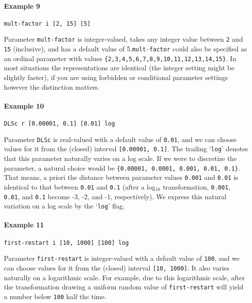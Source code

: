 \documentclass[manual.tex]{subfiles}
\begin{document}
\paragraph{Example 9}
\begin{verbatim}
mult-factor i [2, 15] [5]
\end{verbatim}
Parameter \texttt{mult-factor} is integer-valued, takes any integer value between \texttt{2} and \texttt{15} (inclusive), and has a default value of 5.\texttt{mult-factor} could also be specified as an ordinal parameter with values \texttt{\{2,3,4,5,6,7,8,9,10,11,12,13,14,15\}}. In most situations the representations are identical (the integer setting might be slightly faster), if you are using forbidden or conditional parameter settings however the distinction matters.



\paragraph{Example 10}
\begin{verbatim}
DLSc r [0.00001, 0.1] [0.01] log
\end{verbatim}
Parameter \texttt{DLSc} is real-valued with a default value of \texttt{0.01}, and we can choose values for it from the (closed) interval \texttt{[0.00001, 0.1]}.
The trailing `\texttt{log}' denotes that this parameter naturally varies on a log scale. If we were to discretize the parameter, a natural choice would be
\texttt{\{0.00001, 0.0001, 0.001, 0.01, 0.1\}}. That means, a priori the distance between parameter values \texttt{0.001} and \texttt{0.01} is identical to that between \texttt{0.01} and \texttt{0.1} (after a log$_{10}$ transformation, \texttt{0.001}, \texttt{0.01}, and \texttt{0.1} become -3, -2, and -1, respectively).
We express this natural variation on a log scale by the `\texttt{log}' flag. %

\paragraph{Example 11}
\begin{verbatim}
first-restart i [10, 1000] [100] log
\end{verbatim}
Parameter \texttt{first-restart} is integer-valued with a default value of \texttt{100}, and we can choose values for it from the (closed) interval \texttt{[10, 1000]}.
It also varies naturally on a logarithmic scale. For example, due to this logarithmic scale, after the transformation drawing a uniform random value of \texttt{first-restart} will yield a number below \texttt{100} half the time.
\end{document}
